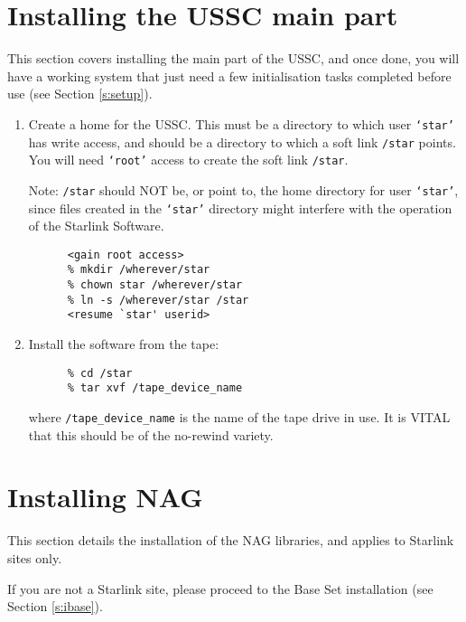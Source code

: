 \section{Installing the USSC main part}
\label{s:imain}

This section covers installing the main  part of the USSC, and once done,
you will have a working system that just need a few initialisation tasks
completed before use (see Section \ref{s:setup}).

\begin{enumerate}

\item Create a home for the USSC.  This must be a directory to which
user {\tt `star'} has write access,  and should be a directory to which a
soft link {\tt /star} points.  You will need {\tt `root'} access to
create the soft link {\tt /star}.

Note: {\tt /star} should NOT be, or point to, the home directory for user
{\tt `star'}, since files created in the {\tt `star'} directory might interfere
with the operation of the Starlink Software.

\begin{verbatim}
      <gain root access>
      % mkdir /wherever/star
      % chown star /wherever/star
      % ln -s /wherever/star /star
      <resume `star' userid>
\end{verbatim}

\item Install the software from the tape:

\begin{verbatim}
      % cd /star
      % tar xvf /tape_device_name
\end{verbatim}

where \verb+/tape_device_name+ is the name of the tape drive in use. It is
VITAL that this should be of the no-rewind variety.

\end{enumerate}

\section{Installing NAG}
\label{s:inag}

This section details the installation of the NAG libraries, and applies to
Starlink sites only.

If you are not a Starlink site, please proceed to the Base Set installation
(see Section \ref{s:ibase}).


